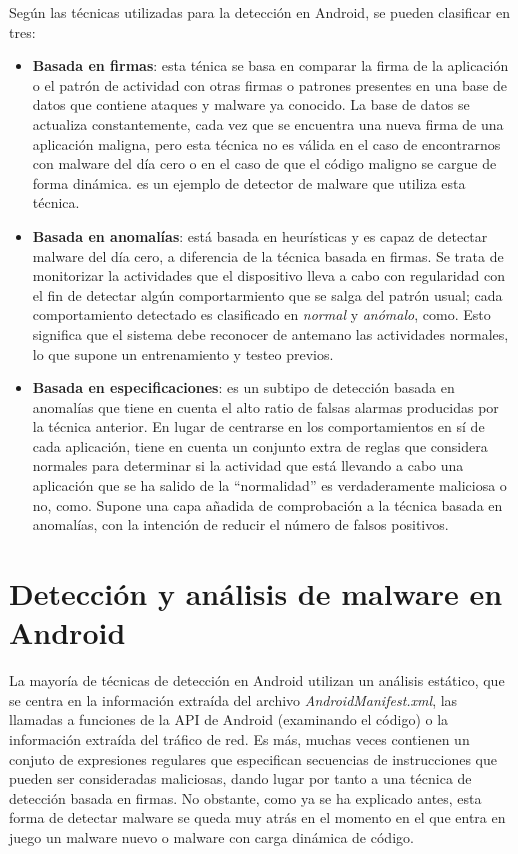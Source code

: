 Según las técnicas utilizadas para la detección en Android, se pueden clasificar en tres\hypersetup{citecolor=red}\cite{detection}:

\begin{itemize}
	\item \textbf{Basada en firmas}: esta ténica se basa en comparar la firma de la aplicación o el patrón de actividad con otras firmas o patrones presentes en una base de datos que contiene ataques y malware ya conocido. La base de datos se actualiza constantemente, cada vez que se encuentra una nueva firma de una aplicación maligna, pero esta técnica no es válida en el caso de encontrarnos con malware del día cero o en el caso de que el código maligno se cargue de forma dinámica.\hypersetup{citecolor=red}\cite{firma} es un ejemplo de detector de malware que utiliza esta técnica.
	\item \textbf{Basada en anomalías}: está basada en heurísticas y es capaz de detectar malware del día cero, a diferencia de la técnica basada en firmas. Se trata de monitorizar la actividades que el dispositivo lleva a cabo con regularidad con el fin de detectar algún comportarmiento que se salga del patrón usual; cada comportamiento detectado es clasificado en \textit{normal} y \textit{anómalo}, como\hypersetup{citecolor=red}\cite{anomalias}. Esto significa que el sistema debe reconocer de antemano las actividades normales, lo que supone un entrenamiento y testeo previos.
	\item \textbf{Basada en especificaciones}: es un subtipo de detección basada en anomalías que tiene en cuenta el alto ratio de falsas alarmas producidas por la técnica anterior. En lugar de centrarse en los comportamientos en sí de cada aplicación, tiene en cuenta un conjunto extra de reglas que considera normales para determinar si la actividad que está llevando a cabo una aplicación que se ha salido de la ``normalidad'' es verdaderamente maliciosa o no, como\hypersetup{citecolor=red}\cite{espec}. Supone una capa añadida de comprobación a la técnica basada en anomalías, con la intención de reducir el número de falsos positivos.
\end{itemize}

\section{Detección y análisis de malware en Android}

La mayoría de técnicas de detección en Android utilizan un análisis estático\hypersetup{citecolor=red}\cite{martin}, que se centra en la información extraída del archivo \textit{AndroidManifest.xml}, las llamadas a funciones de la API de Android (examinando el código) o la información extraída del tráfico de red. Es más, muchas veces contienen un conjuto de expresiones regulares que especifican secuencias de instrucciones que pueden ser consideradas maliciosas, dando lugar por tanto a una técnica de detección basada en firmas. No obstante, como ya se ha explicado antes, esta forma de detectar malware se queda muy atrás en el momento en el que entra en juego un malware nuevo o malware con carga dinámica de código.

